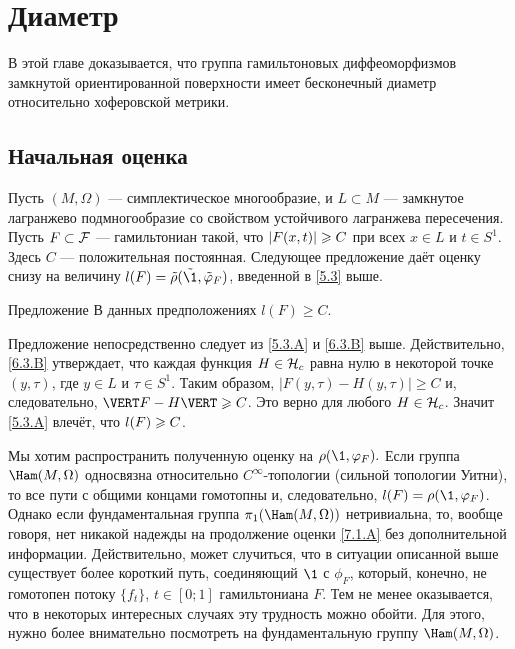 \chapter{Диаметр}

В этой главе доказывается, что группа гамильтоновых диффеоморфизмов
замкнутой ориентированной поверхности имеет бесконечный диаметр
относительно хоферовской метрики. 

\section{Начальная оценка}
Пусть $(M, \Omega)$ — симплектическое многообразие, и $L \subset M$
— замкнутое лагранжево подмногообразие со свойством  устойчивого
лагранжева пересечения. 
Пусть $F \subset \mathcal{F}$ — гамильтониан такой, что $| F (x, t) | \z\ge C$ при всех $x \in L$ и $t \in S^1$.
Здесь $C$ — положительная постоянная.
Следующее предложение даёт оценку снизу на величину $l (F) \z= \tilde\rho (\tilde\1, \tilde\phi_F)$, введенной в \ref{5.3} выше.

\begin{thm}{Предложение}\label{7.1.A}
В данных предположениях $l (F) \ge C$.
\end{thm}

Предложение непосредственно следует из \ref{5.3.A} и \ref{6.3.B} выше.
Действительно, \ref{6.3.B} утверждает, что каждая функция $H \in \mathcal{H}_c$ равна нулю в некоторой точке $(y, \tau)$, где $y \in L$ и $\tau \in S^1$.
Таким образом, $| F (y, \tau) - H (y, \tau) | \ge C$ и, следовательно, $\VERT F - H \VERT \z\ge C$.
Это верно для любого $H \in \mathcal{H}_c$.
Значит \ref{5.3.A} влечёт, что $l (F) \z\ge C$.
\qeds

Мы хотим распространить полученную оценку на $\rho (\1, \phi_F).$
Если группа $\Ham (M, \Omega)$ односвязна относительно $C^\infty$-топологии (сильной топологии Уитни), то все пути с общими концами гомотопны и, следовательно, $l (F) = \rho (\1, \phi_F)$.
Однако если фундаментальная группа $\pi_1 (\Ham (M, \Omega))$ нетривиальна, то, вообще говоря, нет никакой надежды на продолжение оценки \ref{7.1.A} без дополнительной информации.
Действительно, может случиться, что в ситуации описанной выше существует более короткий путь, соединяющий $\1$ с $\phi_F$, который, конечно, не гомотопен потоку $\{f_t\}$, $t \in [0; 1]$ гамильтониана $F$.
Тем не менее оказывается, что в некоторых интересных случаях эту трудность можно обойти.
Для этого, нужно более внимательно посмотреть на фундаментальную группу $\Ham (M, \Omega)$.

